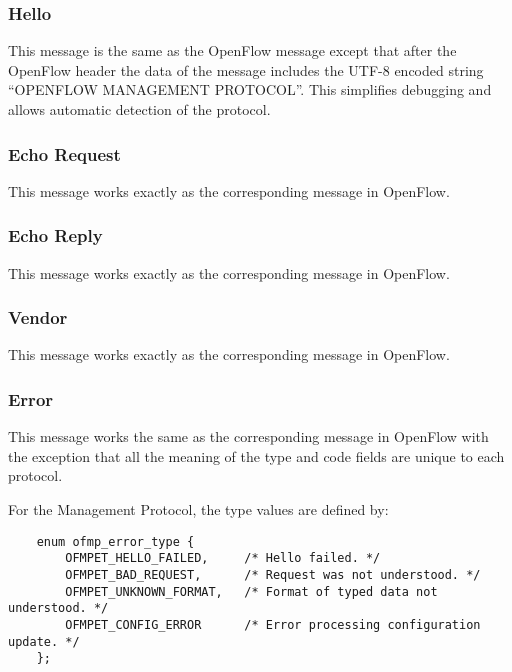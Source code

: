 \documentclass[11pt,a4paper]{article}
\begin{document}
\subsubsection{Hello}
\label{sec-2.6.1}


    This message is the same as the OpenFlow message except that
    after the OpenFlow header the data of the message includes the
    UTF-8 encoded string ``OPENFLOW MANAGEMENT PROTOCOL''.  This
    simplifies debugging and allows automatic detection of the
    protocol.

\subsubsection{Echo Request}
\label{sec-2.6.2}


    This message works exactly as the corresponding message in
    OpenFlow.

\subsubsection{Echo Reply}
\label{sec-2.6.3}


    This message works exactly as the corresponding message in
    OpenFlow.

\subsubsection{Vendor}
\label{sec-2.6.4}


    This message works exactly as the corresponding message in
    OpenFlow.

\subsubsection{Error}
\label{sec-2.6.5}


    This message works the same as the corresponding message in
    OpenFlow with the exception that all the meaning of the type and
    code fields are unique to each protocol.

    For the Management Protocol, the type values are defined by:

{ \footnotesize

\begin{verbatim}
    enum ofmp_error_type {
        OFMPET_HELLO_FAILED,     /* Hello failed. */
        OFMPET_BAD_REQUEST,      /* Request was not understood. */
        OFMPET_UNKNOWN_FORMAT,   /* Format of typed data not understood. */
        OFMPET_CONFIG_ERROR      /* Error processing configuration update. */
    };

\end{verbatim}


}
\end{document}
